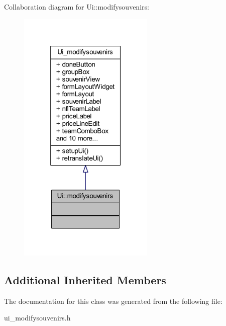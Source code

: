 Collaboration diagram for Ui\+:\+:modifysouvenirs\+:
\nopagebreak
\begin{figure}[H]
\begin{center}
\leavevmode
\includegraphics[width=184pt]{class_ui_1_1modifysouvenirs__coll__graph}
\end{center}
\end{figure}
\subsection*{Additional Inherited Members}


The documentation for this class was generated from the following file\+:\begin{DoxyCompactItemize}
\item 
ui\+\_\+modifysouvenirs.\+h\end{DoxyCompactItemize}
